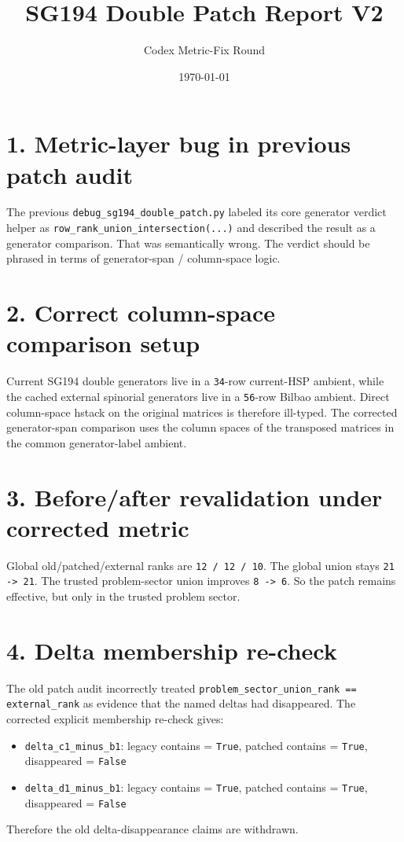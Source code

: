 \documentclass[11pt]{article}
\title{SG194 Double Patch Report V2}
\author{Codex Metric-Fix Round}
\date{\today}
\begin{document}
\maketitle

\section*{1. Metric-layer bug in previous patch audit}
The previous \texttt{debug\_sg194\_double\_patch.py} labeled its core generator verdict helper as \texttt{row\_rank\_union\_intersection(...)} and described the result as a generator comparison. That was semantically wrong. The verdict should be phrased in terms of generator-span / column-space logic.

\section*{2. Correct column-space comparison setup}
Current SG194 double generators live in a \texttt{34}-row current-HSP ambient, while the cached external spinorial generators live in a \texttt{56}-row Bilbao ambient. Direct column-space hstack on the original matrices is therefore ill-typed. The corrected generator-span comparison uses the column spaces of the transposed matrices in the common generator-label ambient.

\section*{3. Before/after revalidation under corrected metric}
Global old/patched/external ranks are \texttt{12 / 12 / 10}. The global union stays \texttt{21 -> 21}. The trusted problem-sector union improves \texttt{8 -> 6}. So the patch remains effective, but only in the trusted problem sector.

\section*{4. Delta membership re-check}
The old patch audit incorrectly treated \texttt{problem\_sector\_union\_rank == external\_rank} as evidence that the named deltas had disappeared. The corrected explicit membership re-check gives:
\begin{itemize}
\item \texttt{delta\_c1\_minus\_b1}: legacy contains = \texttt{True}, patched contains = \texttt{True}, disappeared = \texttt{False}
\item \texttt{delta\_d1\_minus\_b1}: legacy contains = \texttt{True}, patched contains = \texttt{True}, disappeared = \texttt{False}
\end{itemize}
Therefore the old delta-disappearance claims are withdrawn.
\end{document}
